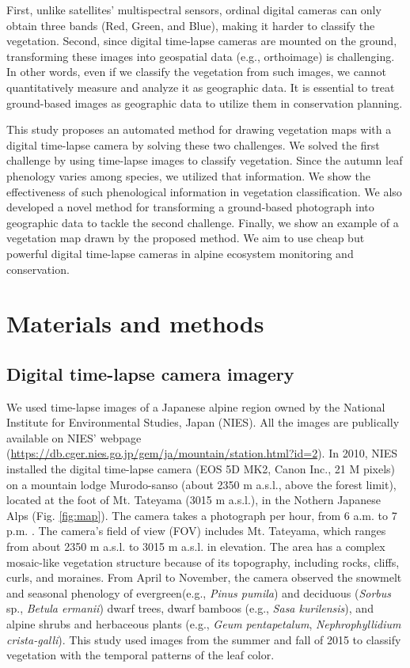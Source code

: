 \documentclass{article}
\begin{document}
First, unlike satellites' multispectral sensors, ordinal digital cameras can only obtain three bands (Red, Green, and Blue), making it harder to classify the vegetation. Second, since digital time-lapse cameras are mounted on the ground, transforming these images into geospatial data (e.g., orthoimage) is challenging. In other words, even if we classify the vegetation from such images, we cannot quantitatively measure and analyze it as geographic data. It is essential to treat ground-based images as geographic data to utilize them in conservation planning.

This study proposes an automated method for drawing vegetation maps with a digital time-lapse camera by solving these two challenges. We solved the first challenge by using time-lapse images to classify vegetation. Since the autumn leaf phenology varies among species, we utilized that information. We show the effectiveness of such phenological information in vegetation classification. We also developed a novel method for transforming a ground-based photograph into geographic data to tackle the second challenge. Finally, we show an example of a vegetation map drawn by the proposed method. We aim to use cheap but powerful digital time-lapse cameras in alpine ecosystem monitoring and conservation.

\hypertarget{materials-and-methods}{%
\section{Materials and methods}\label{materials-and-methods}}

\hypertarget{digital-time-lapse-camera-imagery}{%
\subsection{Digital time-lapse camera imagery}\label{digital-time-lapse-camera-imagery}}

We used time-lapse images of a Japanese alpine region owned by the National Institute for Environmental Studies, Japan (NIES). All the images are publically available on NIES' webpage (\url{https://db.cger.nies.go.jp/gem/ja/mountain/station.html?id=2}). In 2010, NIES installed the digital time-lapse camera (EOS 5D MK2, Canon Inc., 21 M pixels) on a mountain lodge Murodo-sanso (about 2350 m a.s.l., above the forest limit), located at the foot of Mt. Tateyama (3015 m a.s.l.), in the Nothern Japanese Alps (Fig. \ref{fig:map}). The camera takes a photograph per hour, from 6 a.m. to 7 p.m. . The camera's field of view (FOV) includes Mt. Tateyama, which ranges from about 2350 m a.s.l. to 3015 m a.s.l. in elevation. The area has a complex mosaic-like vegetation structure because of its topography, including rocks, cliffs, curls, and moraines. From April to November, the camera observed the snowmelt and seasonal phenology of evergreen(e.g., \emph{Pinus pumila}) and deciduous (\emph{Sorbus} sp., \emph{Betula ermanii}) dwarf trees, dwarf bamboos (e.g., \emph{Sasa kurilensis}), and alpine shrubs and herbaceous plants (e.g., \emph{Geum pentapetalum}, \emph{Nephrophyllidium crista-galli}). This study used images from the summer and fall of 2015 to classify vegetation with the temporal patterns of the leaf color.
\end{document}
